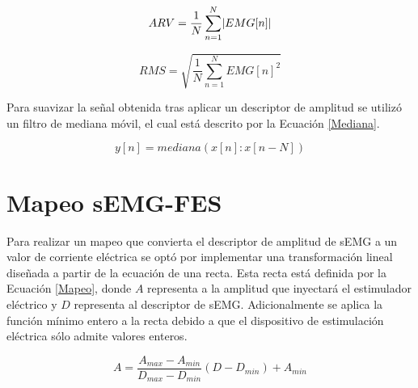\begin{equation}
	ARV = \frac{1}{N} \sum_{n=1}^{N} \lvert EMG[n]\rvert
	\label{ARV}
\end{equation}

\begin{equation}
	RMS = \sqrt{\frac{1}{N} \sum_{n=1}^{N} EMG[n]^{2}}
	\label{RMS}
\end{equation}

Para suavizar la señal obtenida tras aplicar un descriptor de amplitud se utilizó un filtro de mediana móvil, el cual está descrito por la Ecuación \ref{Mediana}.

\begin{equation}
	y[n] = mediana(x[n]:x[n-N])
	\label{Mediana}
\end{equation}

\section{Mapeo sEMG-FES}
Para realizar un mapeo que convierta el descriptor de amplitud de sEMG a un valor de corriente eléctrica se optó por implementar una transformación lineal diseñada a partir de la ecuación de una recta. Esta recta está definida por la Ecuación \ref{Mapeo}, donde $A$ representa a la amplitud que inyectará el estimulador eléctrico y $D$ representa al descriptor de sEMG. Adicionalmente se aplica la función mínimo entero a la recta debido a que el dispositivo de estimulación eléctrica sólo admite valores enteros.

\begin{equation}
	A = \frac{A_{max} - A_{min}}{D_{max} - D_{min}}(D - D_{min}) + A_{min}
	\label{Mapeo}
\end{equation}




